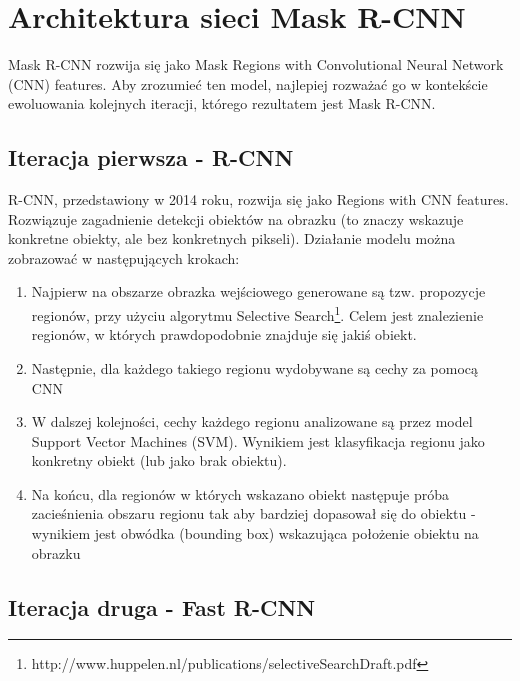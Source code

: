 \section{Architektura sieci Mask R-CNN}
\label{sec:architekrura_mask_rcnn}

Mask R-CNN rozwija się jako Mask Regions with Convolutional Neural Network (CNN) features.
Aby zrozumieć ten model, najlepiej rozważać go w kontekście ewoluowania kolejnych iteracji, którego rezultatem jest Mask R-CNN.

\subsection{Iteracja pierwsza - R-CNN}


R-CNN, przedstawiony w 2014 roku, rozwija się jako Regions with CNN features.
Rozwiązuje zagadnienie detekcji obiektów na obrazku (to znaczy wskazuje konkretne obiekty, ale bez konkretnych pikseli).
Działanie modelu można zobrazować w następujących krokach:

\begin{enumerate}
  \item Najpierw na obszarze obrazka wejściowego generowane są tzw. propozycje regionów, przy użyciu algorytmu Selective Search\footnote{http://www.huppelen.nl/publications/selectiveSearchDraft.pdf}.
        Celem jest znalezienie regionów, w których prawdopodobnie znajduje się jakiś obiekt.
	\item Następnie, dla każdego takiego regionu wydobywane są cechy za pomocą CNN
  \item W dalszej kolejności, cechy każdego regionu analizowane są przez model Support Vector Machines (SVM).
        Wynikiem jest klasyfikacja regionu jako konkretny obiekt (lub jako brak obiektu).
	\item Na końcu, dla regionów w których wskazano obiekt następuje próba zacieśnienia obszaru regionu tak aby bardziej dopasował się do obiektu - wynikiem jest obwódka (bounding box) wskazująca położenie obiektu na obrazku
\end{enumerate}

\subsection{Iteracja druga - Fast R-CNN}


